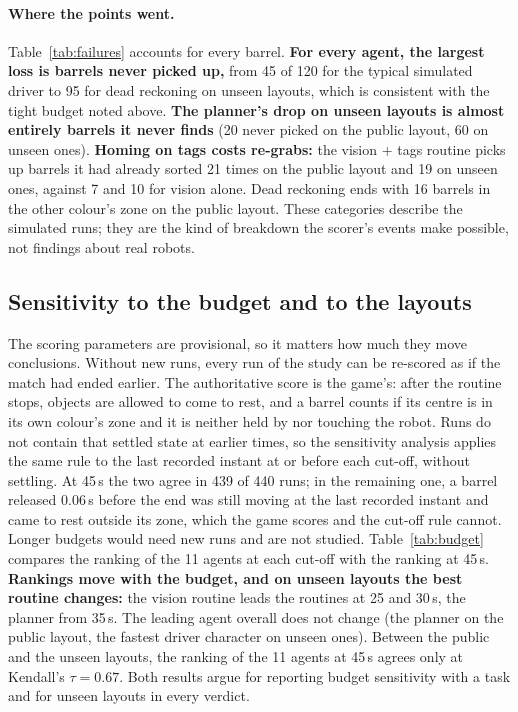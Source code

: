 \documentclass[11pt]{article}
\begin{document}
\paragraph{Where the points went.} Table~\ref{tab:failures} accounts for every barrel.
\textbf{For every agent, the largest loss is barrels never picked up,} from 45 of 120 for the
typical simulated driver to 95 for dead reckoning on unseen layouts, which is consistent with
the tight budget noted above. \textbf{The planner's drop on unseen layouts is almost entirely barrels it
never finds} (20 never picked on the public layout, 60 on unseen ones). \textbf{Homing on tags
costs re-grabs:} the vision + tags routine picks up barrels it had already sorted 21 times on
the public layout and 19 on unseen ones, against 7 and 10 for vision alone. Dead reckoning ends
with 16 barrels in the other colour's zone on the public layout. These categories describe
the simulated runs; they are the kind of breakdown the scorer's events make possible, not findings
about real robots.

\subsection{Sensitivity to the budget and to the layouts}

The scoring parameters are provisional, so it matters how much they move conclusions. Without new
runs, every run of the study can be re-scored as if the match had ended earlier. The authoritative
score is the game's: after the routine stops, objects are allowed to come to rest, and a barrel counts
if its centre is in its own colour's zone and it is neither held by nor touching the robot. Runs do not
contain that settled state at earlier times, so the sensitivity analysis applies the same rule to the
last recorded instant at or before each cut-off, without settling. At 45\,s the two agree in 439 of 440
runs; in the remaining one, a barrel released 0.06\,s before the end was still moving at the last
recorded instant and came to rest outside its zone, which the game scores and the cut-off rule cannot.
Longer budgets would need new runs and are not studied. Table~\ref{tab:budget} compares the ranking
of the 11 agents at each cut-off with the ranking at 45\,s. \textbf{Rankings move with the budget,
and on unseen layouts the best routine changes:} the vision routine leads the routines at 25 and
30\,s, the planner from 35\,s. The leading agent overall does not change (the planner on the public
layout, the fastest driver character on unseen ones). Between the public and the unseen layouts, the
ranking of the 11 agents at 45\,s agrees only at Kendall's $\tau=0.67$. Both results argue for
reporting budget sensitivity with a task and for unseen layouts in every verdict.
\end{document}
